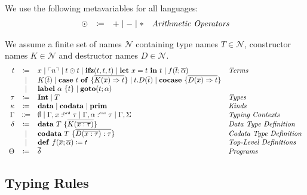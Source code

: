 \begin{definition}
  We use the following metavariables for all languages:
  \[
    \begin{array}{rcll}
      \odot  & \coloneqq & + \mid - \mid * & \emph{Arithmetic Operators}
    \end{array}
  \]
\end{definition}

\begin{definition}
  We assume a finite set of names $\mathcal{N}$ containing type names $T\in\mathcal{N}$, constructor names $K\in\mathcal{N}$ and destructor names $D\in\mathcal{N}$.
  \[ 
    \begin{array}{r c l l}
      t & \coloneqq & x \mid \ulcorner n \urcorner \mid t \odot t \mid \mathbf{ifz}(t, t, t) \mid \mathbf{let}\ x = t\ \mathbf{in}\ t \mid f(\overline{t}; \overline{\alpha}) & \emph{Terms}\\
      & \mid & K(\overline{t}) \mid \mathbf{case}\ t\ \mathbf{of}\ \{ \overline{K(\overline{x}) \Rightarrow t} \} \mid t.D(\overline{t}) \mid \mathbf{cocase}\ \{ \overline{D(\overline{x}) \Rightarrow t} \} & \\
      & \mid & \mathbf{label}\ \alpha\ \{t \} \mid \mathbf{goto}(t; \alpha) & \\
      \tau & \coloneqq & \mathbf{Int} \mid T & \emph{Types} \\
      \kappa & \coloneq & \mathbf{data} \mid \mathbf{codata} \mid \mathbf{prim} & \emph{Kinds} \\
      \Gamma & \Coloneqq & \emptyset \mid \Gamma, x :^{\text{\tiny prd}} \tau \mid \Gamma, \alpha :^{\text{\tiny cns}} \tau \mid \Gamma, \Sigma& \emph{Typing Contexts} \\
      \delta & \coloneqq & \mathbf{data}\ T\ \{ \overline{K(\overline{x:\tau})} \} & \emph{Data Type Definition}\\
       & \mid & \mathbf{codata}\ T\ \{ \overline{D(\overline{x:\tau}) : \tau}\} & \emph{Codata Type Definition}\\
       & \mid & \mathbf{def}\ f(\overline{x};\overline{\alpha}) \coloneq t & \emph{Top-Level Definitions}\\
      \Theta & \coloneqq & \overline{\delta} & \emph{Programs}\\
    \end{array}
  \]
\end{definition}

\subsection{Typing Rules}
\label{subsec:fun:typing-rules}


